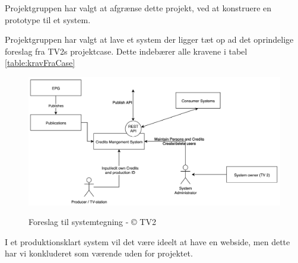 \noindent %
Projektgruppen har valgt at afgrænse dette projekt, ved at konstruere en prototype til et system.

\noindent %
Projektgruppen har valgt at lave et system der ligger tæt op ad det oprindelige foreslag fra TV2s projektcase. Dette indebærer alle kravene i tabel \ref{table:kravFraCase}
\begin{figure}[h]
\centering
\includegraphics[scale=0.35]{figures/tv2_system.png}
\label{fig:tv2_system}
\caption{Foreslag til systemtegning - © TV2}
\end{figure}

\noindent %
I et produktionsklart system vil det være ideelt at have en webside, men dette har vi konkluderet som værende uden for projektet.